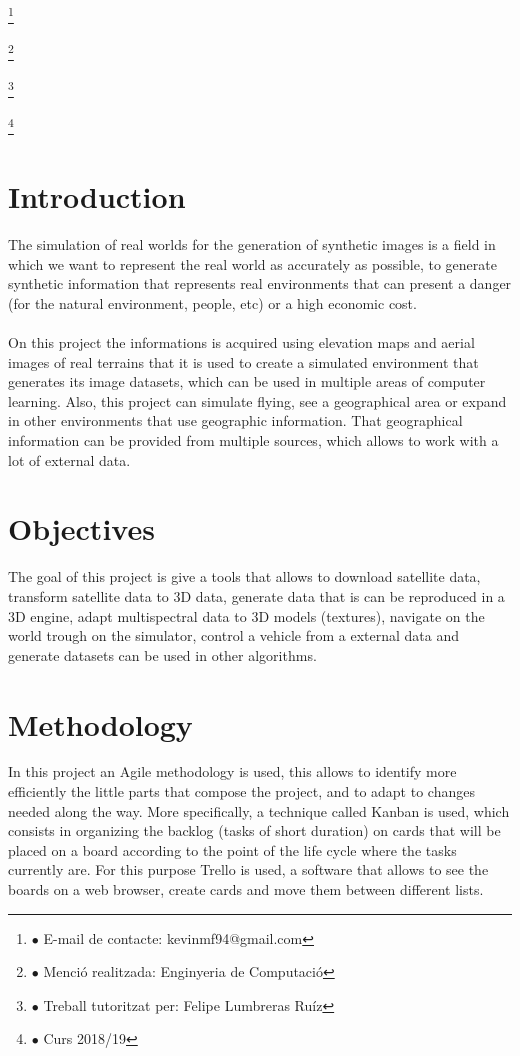 \documentclass[10pt,a4paper,twocolumn,twoside]{article}
\newcommand\blfootnote[1]{%
  \begingroup
  \renewcommand\thefootnote{}\footnote{#1}%
  \addtocounter{footnote}{-1}%
  \endgroup
}
\begin{document}
\blfootnote{$\bullet$ E-mail de contacte: kevinmf94@gmail.com}
\blfootnote{$\bullet$ Menció realitzada: Enginyeria de Computació}
\blfootnote{$\bullet$ Treball tutoritzat per: Felipe Lumbreras Ruíz}
\blfootnote{$\bullet$ Curs 2018/19}

\vspace{-1cm}
\section{Introduction}
The simulation of real worlds for the generation of synthetic images is a field in which we want to represent the real world as accurately as possible, to generate synthetic information that represents real environments that can present a danger (for the natural environment, people, etc) or a high economic cost.
\\
\\
On this project the informations is acquired using elevation maps and aerial images of real terrains that it is used to create a simulated environment that generates its image datasets, which can be used in multiple areas of computer learning. Also, this project can simulate flying, see a geographical area or expand in other environments that use geographic information. That geographical information can be provided from multiple sources, which allows to work with a lot of external data.

\section{Objectives}

The goal of this project is give a tools that allows to download satellite data, transform satellite data to 3D data, generate data that is can be reproduced in a 3D engine, adapt multispectral data to 3D models (textures), navigate on the world trough on the simulator, control a vehicle from a external data and generate datasets can be used in other algorithms.

\section{Methodology}
In this project an Agile methodology is used,  this allows to identify more efficiently the little parts that compose the project, and to adapt to changes needed along the way. More specifically, a technique called Kanban\cite{kanban} is used, which consists in organizing the backlog (tasks of short duration) on cards that will be placed on a board according to the point of the life cycle where the tasks currently are. For this purpose Trello\cite{trello} is used, a software that allows to see the boards on a web browser, create cards and move them between different lists.
\end{document}
